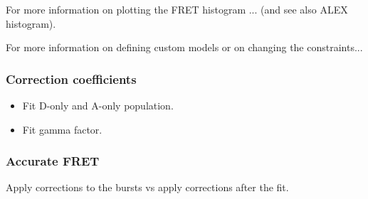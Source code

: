 For more information on plotting the FRET histogram ... (and see also ALEX
histogram).

For more information on defining custom models or on changing the constraints...


\subsubsection{Correction coefficients}


\begin{itemize}
\item Fit D-only and A-only population.
\item Fit gamma factor.
\end{itemize}


\subsubsection{Accurate FRET}

Apply corrections to the bursts vs apply corrections after the fit.


